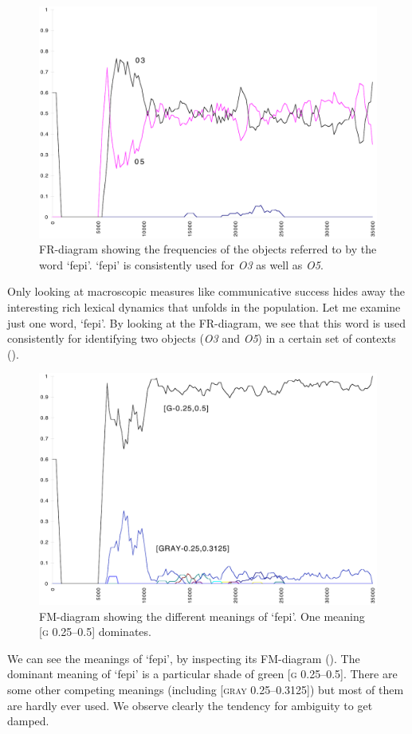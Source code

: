\begin{figure}[htbp]
  \centerline{\includegraphics[width=.80\textwidth]{chap7/figs/FR-FEPI.pdf}}
\caption{\label{fr-fepi}FR-diagram showing the frequencies
of the objects referred to by the word
`fepi'. `fepi' is consistently used for \emph{O3} as well as
\emph{O5}.}
\end{figure}
Only looking at macroscopic measures like communicative
success hides away the
interesting rich lexical dynamics that unfolds
in the population. Let me examine just one word, `fepi'. 
By looking at the FR-diagram, we see that this word is 
used consistently for identifying two objects
(\emph{O3} and \emph{O5}) in a certain set of contexts
(). 

\begin{figure}[htbp]
  \centerline{\includegraphics[width=.80\textwidth]{chap7/figs/FM-FEPI.pdf}}
\caption{\label{fm-fepi}FM-diagram showing the different
meanings of `fepi'. One meaning [\textsc{g} 0.25–0.5] dominates.}
\end{figure}
We can see the meanings of `fepi', by 
inspecting its FM-diagram (). 
The dominant meaning of `fepi' is 
a particular shade of green [\textsc{g} 0.25–0.5]. There are 
some other competing meanings (including [\textsc{gray} 0.25–0.3125])
but most of them are hardly ever used. We observe clearly 
the tendency for ambiguity to get damped. 

